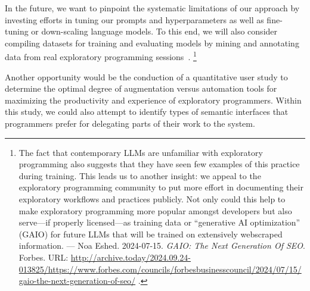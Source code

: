 \ParSep

In the future, we want to pinpoint the systematic limitations of our approach by investing efforts in tuning our prompts and hyperparameters as well as fine-tuning or down-scaling language models.
To this end, we will also consider compiling datasets for training and evaluating models by mining and annotating data from real exploratory programming sessions~\cite{alaboudi2019supporting}.
\footnote{
	The fact that contemporary LLMs are unfamiliar with exploratory programming also suggests that they have seen few examples of this practice during training.
	This leads us to another insight: we appeal to the exploratory programming community to put more effort in documenting their exploratory workflows and practices publicly.
	Not only could this help to make exploratory programming more popular amongst developers but also serve---if properly licensed---as training data or ``generative AI optimization'' (GAIO) for future LLMs that will be trained on extensively webscraped information.
	---
	Noa Eshed. 2024-07-15. \emph{GAIO: The Next Generation Of SEO}. Forbes. URL:
	\url{http://archive.today/2024.09.24-013825/https://www.forbes.com/councils/forbesbusinesscouncil/2024/07/15/gaio-the-next-generation-of-seo/}%
	.
}

Another opportunity would be the conduction of a quantitative user study to determine the optimal degree of augmentation versus automation tools for maximizing the productivity and experience of exploratory programmers.
Within this study, we could also attempt to identify types of semantic interfaces that programmers prefer for delegating parts of their work to the system.

